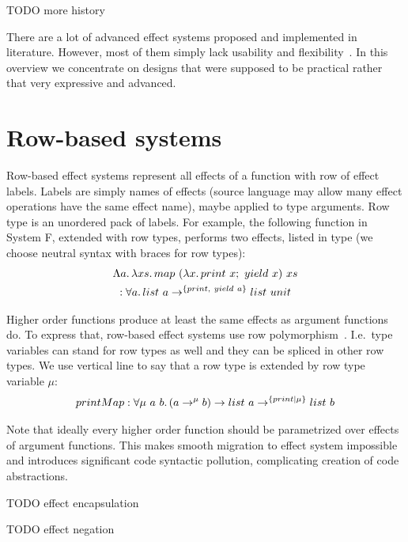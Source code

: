 \documentclass[conference]{IEEEtran}
\newcommand{\seq}{;~}
\newcommand{\ap}{~}
\begin{document}
    TODO more history %

    There are a lot of advanced effect systems proposed and implemented in literature.
    However, most of them simply lack usability and flexibility~\cite{odersky2022scoped}.
    In this overview we concentrate on designs that were supposed to be practical rather that very expressive and advanced.


    \section{Row-based systems} \label{sec:rows}

    Row-based effect systems represent all effects of a function with row of effect labels.
    Labels are simply names of effects (source language may allow many effect operations have the same effect name), maybe applied to type arguments.
    Row type is an unordered pack of labels.
    For example, the following function in System F, extended with row types, performs two effects, listed in type (we choose neutral syntax with braces for row types):
    \begin{multline*}
        \Lambda a\ldotp\lambda xs\ldotp map \ap (\lambda x\ldotp print\ap x\seq yield\ap x) \ap xs \\ : \forall a \ldotp list\ap a \to^{\{print, ~yield \ap a\}} list \ap unit
    \end{multline*}

    Higher order functions produce at least the same effects as argument functions do.
    To express that, row-based effect systems use row polymorphism~\cite{gaster1996polymorphic}.
    I.e.\ type variables can stand for row types as well and they can be spliced in other row types.
    We use vertical line to say that a row type is extended by row type variable $\mu$:
    \begin{multline*}
        printMap : \forall \mu \ap a \ap b\ldotp (a \to^\mu b) \to list \ap a \to^{\{print|\mu\}} list \ap b
    \end{multline*}

    Note that ideally every higher order function should be parametrized over effects of argument functions.
    This makes smooth migration to effect system impossible and introduces significant code syntactic pollution, complicating creation of code abstractions.

    TODO effect encapsulation %

    TODO effect negation %
\end{document}
